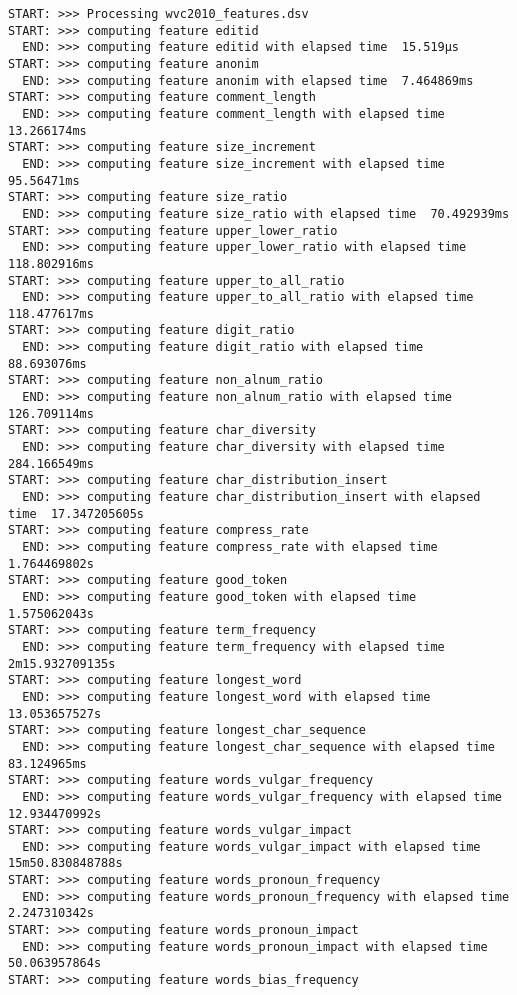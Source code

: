 \begin{lstlisting}[style=data,basicstyle=\tiny\ttfamily]
START: >>> Processing wvc2010_features.dsv
START: >>> computing feature editid
  END: >>> computing feature editid with elapsed time  15.519µs
START: >>> computing feature anonim
  END: >>> computing feature anonim with elapsed time  7.464869ms
START: >>> computing feature comment_length
  END: >>> computing feature comment_length with elapsed time  13.266174ms
START: >>> computing feature size_increment
  END: >>> computing feature size_increment with elapsed time  95.56471ms
START: >>> computing feature size_ratio
  END: >>> computing feature size_ratio with elapsed time  70.492939ms
START: >>> computing feature upper_lower_ratio
  END: >>> computing feature upper_lower_ratio with elapsed time  118.802916ms
START: >>> computing feature upper_to_all_ratio
  END: >>> computing feature upper_to_all_ratio with elapsed time  118.477617ms
START: >>> computing feature digit_ratio
  END: >>> computing feature digit_ratio with elapsed time  88.693076ms
START: >>> computing feature non_alnum_ratio
  END: >>> computing feature non_alnum_ratio with elapsed time  126.709114ms
START: >>> computing feature char_diversity
  END: >>> computing feature char_diversity with elapsed time  284.166549ms
START: >>> computing feature char_distribution_insert
  END: >>> computing feature char_distribution_insert with elapsed time  17.347205605s
START: >>> computing feature compress_rate
  END: >>> computing feature compress_rate with elapsed time  1.764469802s
START: >>> computing feature good_token
  END: >>> computing feature good_token with elapsed time  1.575062043s
START: >>> computing feature term_frequency
  END: >>> computing feature term_frequency with elapsed time  2m15.932709135s
START: >>> computing feature longest_word
  END: >>> computing feature longest_word with elapsed time  13.053657527s
START: >>> computing feature longest_char_sequence
  END: >>> computing feature longest_char_sequence with elapsed time  83.124965ms
START: >>> computing feature words_vulgar_frequency
  END: >>> computing feature words_vulgar_frequency with elapsed time  12.934470992s
START: >>> computing feature words_vulgar_impact
  END: >>> computing feature words_vulgar_impact with elapsed time  15m50.830848788s
START: >>> computing feature words_pronoun_frequency
  END: >>> computing feature words_pronoun_frequency with elapsed time  2.247310342s
START: >>> computing feature words_pronoun_impact
  END: >>> computing feature words_pronoun_impact with elapsed time  50.063957864s
START: >>> computing feature words_bias_frequency

\end{lstlisting}
